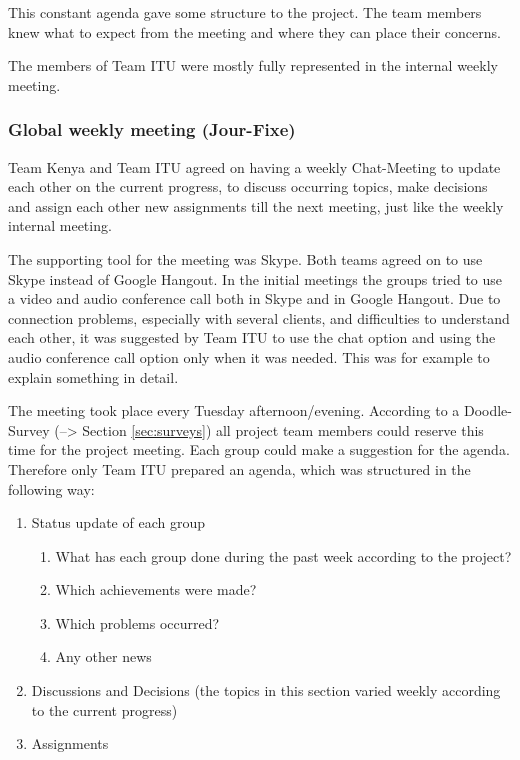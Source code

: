 This constant agenda gave some structure to the project. The team members knew what to expect from the meeting and where they can place their concerns.

The members of Team ITU were mostly fully represented in the internal weekly meeting. 


\subsubsection {Global weekly meeting (Jour-Fixe)}
\label{sec:global_meeting}
Team Kenya and Team ITU agreed on having a weekly Chat-Meeting to update each other on the current progress, to discuss occurring topics, make decisions and assign each other new assignments till the next meeting, just like the weekly internal meeting.

The supporting tool for the meeting was Skype. Both teams agreed on to use Skype instead of Google Hangout. In the initial meetings the groups tried to use a video and audio conference call both in Skype and in Google Hangout. Due to connection problems, especially with several clients, and difficulties to understand each other, it was suggested by Team ITU to use the chat option and using the audio conference call option only when it was needed. This was for example to explain something in detail.

The meeting took place every Tuesday afternoon/evening. According to a Doodle-Survey (--> Section \ref{sec:surveys}) all project team members could reserve this time for the project meeting. Each group could make a suggestion for the agenda. Therefore only Team ITU prepared an agenda, which was structured in the following way:

	\begin{enumerate}
		\item Status update of each group
			\begin{enumerate}
				\item What has each group done during the past week according to the project?
				\item Which achievements were made?	
				\item Which problems occurred?
				\item Any other news
			\end{enumerate}
		\item Discussions and Decisions (the topics in this section varied weekly according to the current progress)
		\item Assignments
	\end{enumerate}

